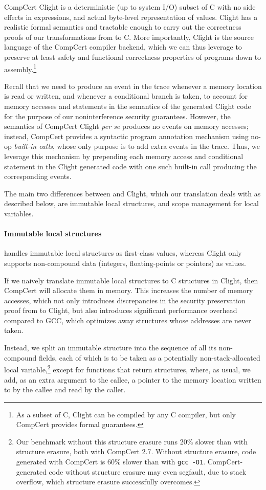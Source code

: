 CompCert Clight is a deterministic (up to system I/O) subset of C with
no side effects in expressions, and actual byte-level representation
of values. Clight has a realistic formal
semantics \cite{Blazy-Leroy-Clight-09,compcert-url} and tractable
enough to carry out the correctness proofs of our transformations
from \lamstar to C.
More importantly, Clight is the source language of the CompCert compiler
backend, which we can
thus leverage to preserve at least safety and functional correctness properties
of \lowstar programs down to assembly.\footnote{As a subset of C,
Clight can be compiled by any C compiler, but only CompCert provides
formal guarantees.}

Recall that we need to produce an event in the trace whenever a memory
location is read or written, and whenever a conditional branch is
taken, to account for memory accesses and statements in the semantics
of the generated Clight code for the purpose of our noninterference
security guarantees. However, the semantics of CompCert
Clight \emph{per se} produces no events on memory accesses; instead,
CompCert provides a syntactic program annotation mechanism using
no-op \emph{built-in calls}, whose only purpose is to add extra events
in the trace. Thus, we leverage this mechanism by prepending each
memory access and conditional statement in the Clight generated code
with one such built-in call producing the corresponding events.

The main two
differences between \cstar and Clight, which our translation deals
with as described below, are immutable local structures, and scope management
for local variables.

\paragraph{Immutable local structures}
\cstar handles immutable local structures as
first-class values, whereas Clight only supports non-compound
data (integers, floating-points or pointers) as values.

If we naively translate immutable local \cstar structures to C structures in
Clight, then CompCert will allocate them in memory.
This increases the number of memory accesses, which not only
introduces discrepancies in the security preservation proof from \cstar
to Clight, but also introduces significant performance
overhead compared to GCC, which optimizes away structures whose
addresses are never taken.

Instead, we split an immutable structure into the sequence of all its
non-compound fields, each of which is to be taken as a potentially
non-stack-allocated local variable,\footnote{Our benchmark without
this structure erasure runs 20\% slower than with structure erasure,
both with CompCert 2.7.
Without structure erasure, code
generated with CompCert is 60\% slower than with
{\tt gcc -O1}. CompCert-generated code without structure erasure may even
segfault, due to stack overflow, which structure erasure successfully
overcomes.} except for functions that return structures, where, as
usual, we add, as an extra argument to the callee, a pointer to the
memory location written to by the callee and read by the caller.

